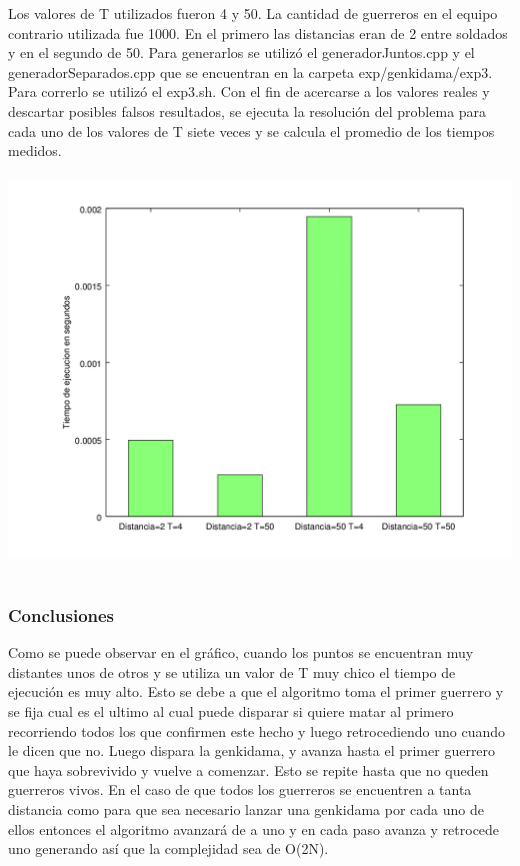 		Los valores de T utilizados fueron 4 y 50.
		La cantidad de guerreros en el equipo contrario utilizada fue 1000.
		En el primero las distancias eran de 2 entre soldados y en el segundo de 50.
		Para generarlos se utilizó el generadorJuntos.cpp y el generadorSeparados.cpp  que se encuentran en la carpeta exp/genkidama/exp3.
		Para correrlo se utilizó el exp3.sh. 
		Con el fin de acercarse a los valores reales y descartar posibles falsos resultados, se ejecuta la resolución del problema para cada uno de los valores de T siete veces y se calcula el promedio de los tiempos medidos.\\

      	\includegraphics[height=11cm]{graficos/genkidama-exp3.png}


    	\subsubsection*{Conclusiones}\;

		Como se puede observar en el gráfico, cuando los puntos se encuentran muy distantes unos de otros y se utiliza un valor de T muy chico el tiempo de ejecución es muy alto. 
		Esto se debe a que el algoritmo toma el primer guerrero y se fija cual es el ultimo al cual puede disparar si quiere matar al primero recorriendo todos los que confirmen este hecho y luego retrocediendo uno cuando le dicen que no. Luego dispara la genkidama, y avanza hasta el primer guerrero que haya sobrevivido y vuelve a comenzar. Esto se repite hasta que no queden guerreros vivos. En el caso de que todos los guerreros se encuentren a tanta distancia como para que sea necesario lanzar una genkidama por cada uno de ellos entonces el algoritmo avanzará de a uno y en cada paso avanza y retrocede uno generando así que la complejidad sea de O(2N). 
